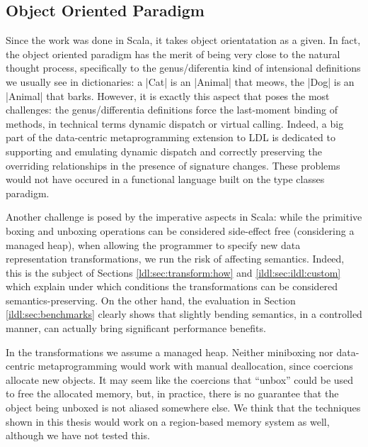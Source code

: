 \subsection{Object Oriented Paradigm}



Since the work was done in Scala, it takes object orientatation as a given. In fact, the object oriented paradigm has the merit of being very close to the natural thought process, specifically to the genus/diferentia kind of intensional definitions we usually see in dictionaries: a |Cat| is an |Animal| that meows, the |Dog| is an |Animal| that barks. However, it is exactly this aspect that poses the most challenges: the genus/differentia definitions force the last-moment binding of methods, in technical terms dynamic dispatch or virtual calling. Indeed, a big part of the data-centric metaprogramming extension to LDL is dedicated to supporting and emulating dynamic dispatch and correctly preserving the overriding relationships in the presence of signature changes. These problems would not have occured in a functional language built on the type classes paradigm.

Another challenge is posed by the imperative aspects in Scala: while the primitive boxing and unboxing operations can be considered side-effect free (considering a managed heap), when allowing the programmer to specify new data representation transformations, we run the risk of affecting semantics. Indeed, this is the subject of Sections \ref{ldl:sec:transform:how} and \ref{ildl:sec:ildl:custom} which explain under which conditions the transformations can be considered semantics-preserving. On the other hand, the evaluation in Section \ref{ildl:sec:benchmarks} clearly shows that slightly bending semantics, in a controlled manner, can actually bring significant performance benefits.

In the transformations we assume a managed heap. Neither miniboxing nor data-centric metaprogramming would work with manual deallocation, since coercions allocate new objects. It may seem like the coercions that ``unbox'' could be used to free the allocated memory, but, in practice, there is no guarantee that the object being unboxed is not aliased somewhere else. We think that the techniques shown in this thesis would work on a region-based \cite{regions} memory system as well, although we have not tested this.

